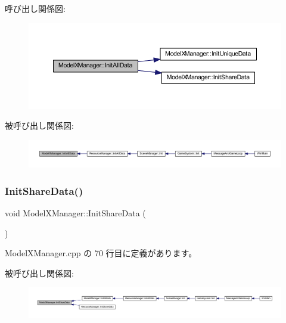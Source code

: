 呼び出し関係図\+:\nopagebreak
\begin{figure}[H]
\begin{center}
\leavevmode
\includegraphics[width=350pt]{class_model_x_manager_a8d7965d9eaa41fcf0297eebea287ee82_cgraph}
\end{center}
\end{figure}
被呼び出し関係図\+:
\nopagebreak
\begin{figure}[H]
\begin{center}
\leavevmode
\includegraphics[width=350pt]{class_model_x_manager_a8d7965d9eaa41fcf0297eebea287ee82_icgraph}
\end{center}
\end{figure}
\mbox{\label{class_model_x_manager_a8096a9ed1b19c41270df944aa855015a}} 
\subsubsection{\texorpdfstring{Init\+Share\+Data()}{InitShareData()}}
{\footnotesize\ttfamily void Model\+X\+Manager\+::\+Init\+Share\+Data (\begin{DoxyParamCaption}{ }\end{DoxyParamCaption})\hspace{0.3cm}{\ttfamily [static]}}



 Model\+X\+Manager.\+cpp の 70 行目に定義があります。

被呼び出し関係図\+:
\nopagebreak
\begin{figure}[H]
\begin{center}
\leavevmode
\includegraphics[width=350pt]{class_model_x_manager_a8096a9ed1b19c41270df944aa855015a_icgraph}
\end{center}
\end{figure}
\mbox{\label{class_model_x_manager_a9bed6cb5ffcd2cbfec6c405e21af362e}} 
